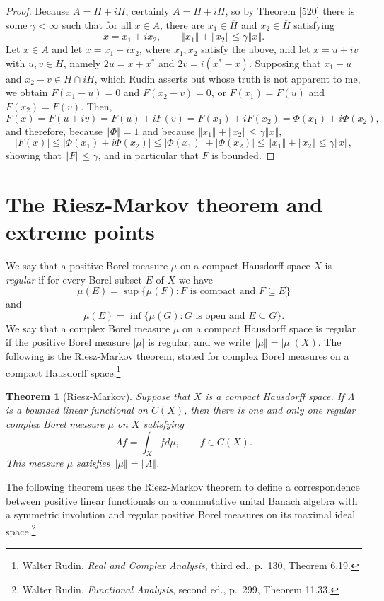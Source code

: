 \documentclass{article}
\newcommand{\norm}[1]{\left\Vert #1 \right\Vert}
\newtheorem{theorem}{Theorem}
\theoremstyle{definition}
\begin{document}
\begin{proof}
Because $A=H+iH$, certainly $A=\overline{H}+i\overline{H}$, so by Theorem \ref{520} there is some $\gamma<\infty$ such
that for all $x \in A$, there are $x_1 \in \overline{H}$ and $x_2 \in \overline{H}$  satisfying
\[
x=x_1+ ix_2, \qquad \norm{x_1}+\norm{x_2} \leq \gamma \norm{x}.
\]
Let $x \in A$ and let $x=x_1+ix_2$, where $x_1,x_2$ satisfy the above, and let
$x=u+iv$ with $u,v \in H$, namely  $2u=x+x^*$ and $2v=i(x^*-x)$.
Supposing that $x_1-u$ and $x_2-v \in \overline{H} \cap i\overline{H}$, which Rudin asserts but whose truth is not apparent to me,
we obtain $F(x_1-u)=0$ and $F(x_2-v)=0$, or $F(x_1)=F(u)$ and $F(x_2)=F(v)$.
Then,
\[
F(x)=F(u+iv)=F(u)+iF(v) = F(x_1)+iF(x_2) = \Phi(x_1)+i\Phi(x_2),
\]
and therefore, because $\norm{\Phi}=1$ and because $\norm{x_1}+\norm{x_2} \leq \gamma\norm{x}$,
\[
|F(x)| \leq |\Phi(x_1)+i\Phi(x_2)| \leq |\Phi(x_1)|+|\Phi(x_2)| \leq \norm{x_1}+\norm{x_2}  \leq \gamma \norm{x},
\]
showing that $\norm{F} \leq \gamma$, and in particular that $F$ is bounded.
\end{proof}




\section{The Riesz-Markov theorem and extreme points}
We say that a positive Borel measure $\mu$ on a compact Hausdorff space $X$ is {\em regular} if
for every Borel subset $E$ of $X$ we have
\[
\mu(E) = \sup \{\mu(F): \textrm{$F$ is compact and $F \subseteq E$}\}
\]
and
\[
\mu(E) = \inf\{ \mu(G): \textrm{$G$ is open and $E \subseteq G$}\}.
\]
We say that a complex Borel measure $\mu$ on a compact Hausdorff space is regular if the positive Borel measure
$|\mu|$ is regular, and we write $\norm{\mu}=|\mu|(X)$.
The following is the Riesz-Markov theorem, stated for complex Borel measures on a compact Hausdorff space.\footnote{Walter Rudin, {\em Real and Complex
Analysis}, third ed., p.~130, Theorem 6.19.}

\begin{theorem}[Riesz-Markov]
Suppose that $X$ is a compact Hausdorff space. If $\Lambda$ is a bounded linear functional on $C(X)$, then there is one and only one regular complex Borel measure
$\mu$ on $X$ satisfying
\[
\Lambda f = \int_X f d\mu, \qquad f \in C(X).
\]
This measure $\mu$ satisfies $\norm{\mu}=\norm{\Lambda}$.
\label{riesz}
\end{theorem}

The following theorem uses the Riesz-Markov theorem to define a correspondence
between positive linear functionals on a commutative unital Banach algebra with a symmetric involution
and regular positive  Borel measures on its maximal ideal space.\footnote{Walter Rudin, {\em Functional Analysis}, second ed., p.~299, Theorem 11.33.}
\end{document}
